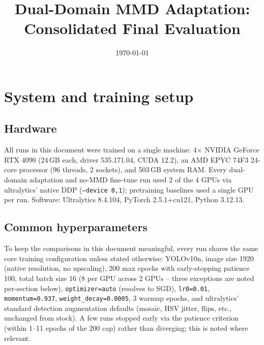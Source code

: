 \documentclass[11pt]{article}
\title{Dual-Domain MMD Adaptation: Consolidated Final Evaluation}
\author{}
\date{\today}
\begin{document}
\maketitle

\section{System and training setup}

\subsection{Hardware}

All runs in this document were trained on a single machine: 4$\times$ NVIDIA GeForce
RTX 4090 (24\,GB each, driver 535.171.04, CUDA 12.2), an AMD EPYC 74F3 24-core
processor (96 threads, 2 sockets), and 503\,GB system RAM. Every dual-domain
adaptation and no-MMD fine-tune run used 2 of the 4 GPUs via ultralytics' native DDP
(\texttt{--device 0,1}); pretraining baselines used a single GPU per run. Software:
Ultralytics 8.4.104, PyTorch 2.5.1+cu121, Python 3.12.13.

\subsection{Common hyperparameters}

To keep the comparisons in this document meaningful, every run shares the same core
training configuration unless stated otherwise: YOLOv10n, image size 1920 (native
resolution, no upscaling), 200 max epochs with early-stopping patience 100, total
batch size 16 (8 per GPU across 2 GPUs -- three exceptions are noted per-section
below), \texttt{optimizer=auto} (resolves to SGD), \texttt{lr0=0.01},
\texttt{momentum=0.937}, \texttt{weight\_decay=0.0005}, 3 warmup epochs, and
ultralytics' standard detection augmentation defaults (mosaic, HSV jitter, flips,
etc., unchanged from stock). A few runs stopped early via the patience criterion
(within 1--11 epochs of the 200 cap) rather than diverging; this is noted where
relevant.
\end{document}
